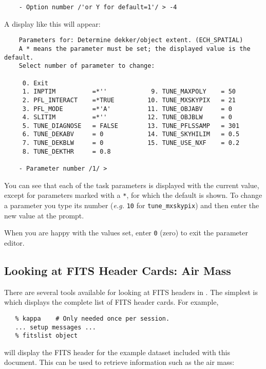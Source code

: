 {{{
\scspec{\small}{ }
\begin{verbatim}
    - Option number /'or Y for default=1'/ > -4
\end{verbatim}
}

A display like this will appear:

{
\scspec{\small}{ }
\begin{verbatim}
    Parameters for: Determine dekker/object extent. (ECH_SPATIAL)
    A * means the parameter must be set; the displayed value is the default.
    Select number of parameter to change:

     0. Exit
     1. INPTIM          =*''            9. TUNE_MAXPOLY    = 50
     2. PFL_INTERACT    =*TRUE         10. TUNE_MXSKYPIX   = 21
     3. PFL_MODE        =*'A'          11. TUNE_OBJABV     = 0
     4. SLITIM          =*''           12. TUNE_OBJBLW     = 0
     5. TUNE_DIAGNOSE   = FALSE        13. TUNE_PFLSSAMP   = 301
     6. TUNE_DEKABV     = 0            14. TUNE_SKYHILIM   = 0.5
     7. TUNE_DEKBLW     = 0            15. TUNE_USE_NXF    = 0.2
     8. TUNE_DEKTHR     = 0.8

    - Parameter number /1/ >
\end{verbatim}
}

You can see that each of the task parameters is displayed with the current
value, except for parameters marked with a \verb+*+, for which the default
is shown.  To change a parameter you type its number ({\it{e.g.}} \verb+10+
for \verb+tune_mxskypix+) and then enter the new value at the prompt.

When you are happy with the values set, enter \verb+0+ (zero) to exit the
parameter editor.


\subsection{Looking at FITS Header Cards: Air Mass}

There are several tools available for looking at FITS headers in
.
The simplest is  which displays
the complete list of FITS header cards.  For example,

{
\scspec{\small}{ }
\begin{verbatim}
   % kappa    # Only needed once per session.
   ... setup messages ...
   % fitslist object
\end{verbatim}
}

will display the FITS header for the example dataset included with this
document.  This can be used to retrieve information such as the air mass:

}}
